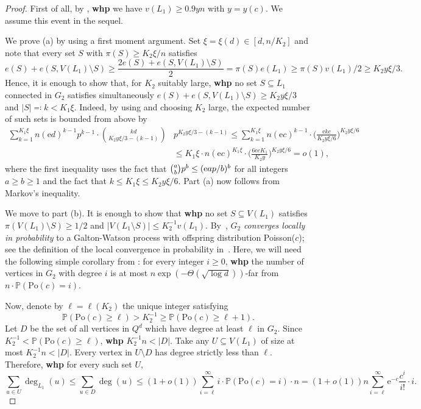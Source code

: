\documentclass[reqno,final,a4paper]{amsart}
\theoremstyle{definition}
\newcommand{\whp}{%
    \textbf{whp}
}
\def\e{\mathrm{e}}
\newcommand{\1}{\mathbbm{1}}
\begin{document}
\begin{proof}
First of all, by , \whp we have $v(L_1)\ge 0.9yn$ with $y=y(c)$.
We assume this event in the sequel.

We prove (a) by using a first moment argument. 
Set $\xi = \xi(d)\in [d,n/K_2]$ and note that every set $S$ with $\pi(S)\ge K_2\xi/n$ satisfies
\[e(S)+e(S,V(L_1)\setminus S)\ge \frac{2e(S)+e(S,V(L_1)\setminus S)}{2} = \pi(S) e(L_1)\ge \pi(S) v(L_1)/2\ge K_2y \xi/3.\]
Hence, it is enough to show that, for $K_2$ suitably large, \textbf{whp} no set $S\subseteq L_1$ connected in $G_2$ satisfies simultaneously $e(S)+e(S,V(L_1)\setminus S)\ge K_2y\xi/3$ and $|S|\eqqcolon k< K_1 \xi$.
Indeed, by using  and choosing $K_2$ large, the expected number of such sets is bounded from above by
\begin{equation}\label{eq:fsm_mom}
\begin{split}
\sum_{k=1}^{K_1\xi} n (\e d)^{k-1} p^{k-1} \cdot \binom{kd}{K_2y \xi/3-(k-1)} &p^{K_2y \xi/3-(k-1)}
\le \sum_{k=1}^{K_1\xi} n (\e c)^{k-1} \cdot \bigg(\frac{\e k c}{K_2y \xi/6}\bigg)^{K_2y \xi/6}\\
&\le K_1\xi\cdot n (\e c)^{K_1\xi} \cdot \bigg(\frac{6\e c K_1}{K_2 y}\bigg)^{K_2y \xi/6}=o(1),
\end{split}
\end{equation}
where the first inequality uses the fact that $\tbinom{a}{b} p^b\le (\e a p/b)^b$ for all integers $a\ge b\ge 1$ and the fact that $k\le K_1\xi\le  K_2y\xi/6$.
Part (a) now follows from Markov's inequality.

We move to part (b). 
It is enough to show that \whp no set $S\subseteq V(L_1)$ satisfies $\pi(V(L_1)\setminus S) \geq 1/2$ and $|V(L_1\setminus S)| \le K_2^{-1}v(L_1)$.
By~\cite[Theorem~3.1]{DKL25}, $G_2$ {\it converges locally in probability} to a Galton-Watson process with offspring distribution Poisson($c$); see the definition of the local convergence in probability in~\cite{DKL25}. 
Here, we will need the following simple corollary from \cite[Theorem~3.1]{DKL25}: for every integer $i\ge 0$, \textbf{whp} the number of vertices in $G_2$ with degree $i$ is at most $n\exp(-\Theta(\sqrt{\log d}))$-far from $n\cdot\mathbb{P}(\mathrm{Po}(c)=i)$.


Now, denote by $\ell = \ell(K_2)$ the unique integer satisfying
\[
\mathbb P(\mathrm{Po}(c)\ge \ell) > K_2^{-1} \ge \mathbb P(\mathrm{Po}(c)\ge \ell+1).
\]
Let $D$ be the set of all vertices in $Q^d$ which have degree at least $\ell$ in $G_2$. Since $K_2^{-1}<\mathbb{P}(\mathrm{Po}(c)\geq\ell)$, \textbf{whp} $K_2^{-1}n<|D|$.
Take any $U\subseteq V(L_1)$ of size at most $K_2^{-1}n<|D|$. Every vertex in $U\setminus D$ has degree strictly less than $\ell$. Therefore, \textbf{whp} for every such set $U$,
$$
 \sum_{u\in U} \deg_{L_1}(u)\le
 \sum_{u\in D} \deg (u)\le
 (1+o(1))\sum_{i=\ell}^{\infty}i\cdot \mathbb{P}(\mathrm{Po}(c)=i)\cdot n
=(1+o(1))n 
 \sum_{i=\ell}^{\infty} \e^{-c} \frac{c^{i}}{i!} \cdot i.
$$


\end{proof}
\end{document}
